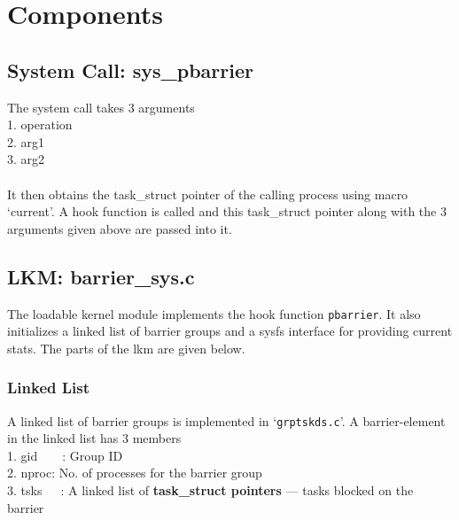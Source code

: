 \section{Components}
\subsection{System Call: sys\_pbarrier} %
The system call takes 3 arguments\\
1. operation\\
2. arg1\\
3. arg2\\\\
It then obtains the task\_struct pointer of the calling process using macro `current'. A hook function is called and this task\_struct pointer along with the 3 arguments given above are passed into it.

\subsection{LKM: barrier\_sys.c} %
The loadable kernel module implements the hook function \texttt{pbarrier}. It also initializes a linked list of barrier groups and a sysfs interface for providing current stats. The parts of the lkm are given below.
\subsubsection{Linked List}
A linked list of barrier groups is implemented in `\texttt{grptskds.c}'. A barrier-element in the linked list has 3 members\\
1. gid\ \ \ \ : Group ID\\
2. nproc: No. of processes for the barrier group\\
3. tsks\ \ \ : A linked list of \textbf{task\_struct pointers} --- tasks blocked on the barrier\\

